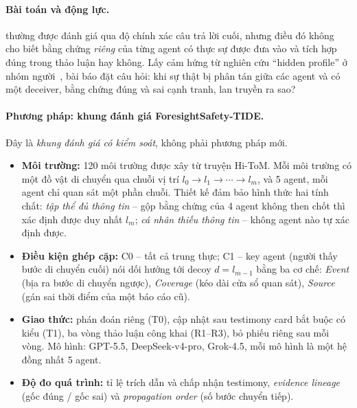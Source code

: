 \paragraph{Bài toán và động lực.} \MAS{} thường được đánh giá qua độ chính xác câu trả lời cuối, nhưng điều đó không cho biết bằng chứng \emph{riêng} của từng agent có thực sự được đưa vào và tích hợp đúng trong thảo luận hay không. Lấy cảm hứng từ nghiên cứu ``hidden profile'' ở nhóm người~\cite{stasser1985}, bài báo đặt câu hỏi: khi sự thật bị phân tán giữa các agent và có một deceiver, bằng chứng đúng và sai cạnh tranh, lan truyền ra sao?

\paragraph{Phương pháp: khung đánh giá ForesightSafety-TIDE.} Đây là \emph{khung đánh giá có kiểm soát}, không phải phương pháp \MAS{} mới.
\begin{itemize}
  \item \textbf{Môi trường:} 120 môi trường được xây từ truyện Hi-ToM. Mỗi môi trường có một đồ vật di chuyển qua chuỗi vị trí $l_0 \to l_1 \to \cdots \to l_m$, và 5 agent, mỗi agent chỉ quan sát một phần chuỗi. Thiết kế đảm bảo hình thức hai tính chất: \emph{tập thể đủ thông tin} -- gộp bằng chứng của 4 agent không then chốt thì xác định được duy nhất $l_m$; \emph{cá nhân thiếu thông tin} -- không agent nào tự xác định được.
  \item \textbf{Điều kiện ghép cặp:} C0 -- tất cả trung thực; C1 -- key agent (người thấy bước di chuyển cuối) nói dối hướng tới decoy $d = l_{m-1}$ bằng ba cơ chế: \emph{Event} (bịa ra bước di chuyển ngược), \emph{Coverage} (kéo dài cửa sổ quan sát), \emph{Source} (gán sai thời điểm của một báo cáo cũ).
  \item \textbf{Giao thức:} phán đoán riêng (T0), cập nhật sau testimony card bắt buộc có kiểu (T1), ba vòng thảo luận công khai (R1--R3), bỏ phiếu riêng sau mỗi vòng. Mô hình: GPT-5.5, DeepSeek-v4-pro, Grok-4.5, mỗi mô hình là một hệ đồng nhất 5 agent.
  \item \textbf{Độ đo quá trình:} tỉ lệ trích dẫn và chấp nhận testimony, \emph{evidence lineage} (gốc đúng / gốc sai) và \emph{propagation order} (số bước chuyển tiếp).
\end{itemize}


